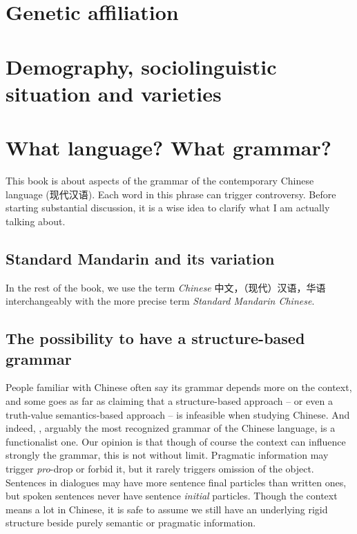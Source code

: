 \documentclass[../main.tex]{subfiles}
\begin{document}
\section{Genetic affiliation}


\section{Demography, sociolinguistic situation and varieties}

\section{What language? What grammar?}

This book is about aspects of the grammar of the contemporary Chinese language (现代汉语). 
Each word in this phrase can trigger controversy. Before starting substantial discussion, it is a wise idea 
to clarify what I am actually talking about. 

\subsection{Standard Mandarin and its variation}


In the rest of the book, we use the term \emph{Chinese} 中文，（现代）汉语，华语 interchangeably with 
the more precise term \emph{Standard Mandarin Chinese}.

\subsection{The possibility to have a structure-based grammar}\label{sec:structure-based}

People familiar with Chinese often say its grammar depends more on the context, and some goes as far as 
claiming that a structure-based approach -- or even a truth-value semantics-based approach -- is infeasible 
when studying Chinese. And indeed, \citet{li1989mandarin}, arguably the most recognized grammar of the Chinese 
language, is a functionalist one. Our opinion is that though of course the context can influence strongly the 
grammar, this is not without limit. Pragmatic information may trigger \emph{pro}-drop or forbid it, but it 
rarely triggers omission of the object. Sentences in dialogues may have more sentence final particles than 
written ones, but spoken sentences never have sentence \emph{initial} particles. Though the context means 
a lot in Chinese, it is safe to assume we still have an underlying rigid structure beside purely semantic 
or pragmatic information.
\end{document}
